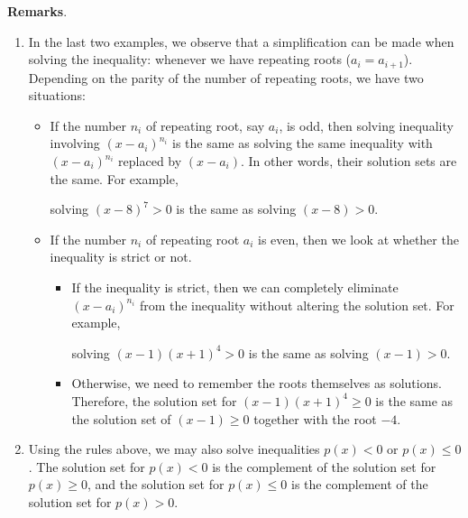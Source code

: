 \documentclass[12pt]{article}
\begin{document}
\textbf{Remarks}.  
\begin{enumerate}
\item
In the last two examples, we observe that a simplification can be made when solving the inequality: whenever we have repeating roots ($a_i=a_{i+1}$).  Depending on the parity of the number of repeating roots, we have two situations:
\begin{itemize}
\item If the number $n_i$ of repeating root, say $a_i$, is odd, then solving inequality involving $(x-a_i)^{n_i}$ is the same as solving the same inequality with $(x-a_i)^{n_i}$ replaced by $(x-a_i)$.  In other words, their solution sets are the same.  For example, 
\begin{center} solving $(x-8)^7>0$ is the same as solving $(x-8)>0$. \end{center}
\item If the number $n_i$ of repeating root $a_i$ is even, then we look at whether the inequality is strict or not.
\begin{itemize}
\item If the inequality is strict, then we can completely eliminate $(x-a_i)^{n_i}$ from the inequality without altering the solution set.  For example, \begin{center} solving $(x-1)(x+1)^4>0$ is the same as solving $(x-1)>0$. \end{center}
\item Otherwise, we need to remember the roots themselves as solutions.  Therefore, the solution set for $(x-1)(x+1)^4\ge 0$ is the same as the solution set of $(x-1)\ge 0$ together with the root $-4$.
\end{itemize}
\end{itemize}
\item
Using the rules above, we may also solve inequalities $p(x)<0$ or $p(x)\le 0$.  The solution set for $p(x)<0$ is the complement of the solution set for $p(x)\ge 0$, and the solution set for $p(x)\le 0$ is the complement of the solution set for $p(x)>0$.
\end{enumerate}
\end{document}
